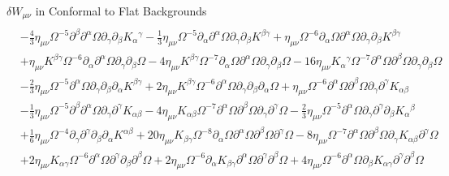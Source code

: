 \documentclass[8pt,aspectratio=1610]{beamer}
\begin{document}
\begin{frame}{$\delta W_{\mu\nu}$ in Conformal to Flat Backgrounds}
{\begin{align}
		\nonumber\\
		&-  \tfrac{4}{3} \eta_{\mu \nu} \Omega^{-5} \partial^{\beta}\partial^{\alpha}\Omega \partial_{\gamma}\partial_{\beta}K_{\alpha}{}^{\gamma} -  \tfrac{1}{3} \eta_{\mu \nu} \Omega^{-5} \partial_{\alpha}\partial^{\alpha}\Omega \partial_{\gamma}\partial_{\beta}K^{\beta \gamma} + \eta_{\mu \nu} \Omega^{-6} \partial_{\alpha}\Omega \partial^{\alpha}\Omega \partial_{\gamma}\partial_{\beta}K^{\beta \gamma}
		\nonumber\\
		& + \eta_{\mu \nu} K^{\beta \gamma} \Omega^{-6} \partial_{\alpha}\partial^{\alpha}\Omega \partial_{\gamma}\partial_{\beta}\Omega - 4 \eta_{\mu \nu} K^{\beta \gamma} \Omega^{-7} \partial_{\alpha}\Omega \partial^{\alpha}\Omega \partial_{\gamma}\partial_{\beta}\Omega - 16 \eta_{\mu \nu} K_{\alpha}{}^{\gamma} \Omega^{-7} \partial^{\alpha}\Omega \partial^{\beta}\Omega \partial_{\gamma}\partial_{\beta}\Omega 
		\nonumber\\
		&-  \tfrac{2}{3} \eta_{\mu \nu} \Omega^{-5} \partial^{\alpha}\Omega \partial_{\gamma}\partial_{\beta}\partial_{\alpha}K^{\beta \gamma} + 2 \eta_{\mu \nu} K^{\beta \gamma} \Omega^{-6} \partial^{\alpha}\Omega \partial_{\gamma}\partial_{\beta}\partial_{\alpha}\Omega + \eta_{\mu \nu} \Omega^{-6} \partial^{\alpha}\Omega \partial^{\beta}\Omega \partial_{\gamma}\partial^{\gamma}K_{\alpha \beta}
		\nonumber\\
		& -  \tfrac{1}{3} \eta_{\mu \nu} \Omega^{-5} \partial^{\beta}\partial^{\alpha}\Omega \partial_{\gamma}\partial^{\gamma}K_{\alpha \beta} - 4 \eta_{\mu \nu} K_{\alpha \beta} \Omega^{-7} \partial^{\alpha}\Omega \partial^{\beta}\Omega \partial_{\gamma}\partial^{\gamma}\Omega -  \tfrac{2}{3} \eta_{\mu \nu} \Omega^{-5} \partial^{\alpha}\Omega \partial_{\gamma}\partial^{\gamma}\partial_{\beta}K_{\alpha}{}^{\beta}
		\nonumber \\
		& + \tfrac{1}{6} \eta_{\mu \nu} \Omega^{-4} \partial_{\gamma}\partial^{\gamma}\partial_{\beta}\partial_{\alpha}K^{\alpha \beta} + 20 \eta_{\mu \nu} K_{\beta \gamma} \Omega^{-8} \partial_{\alpha}\Omega \partial^{\alpha}\Omega \partial^{\beta}\Omega \partial^{\gamma}\Omega - 8 \eta_{\mu \nu} \Omega^{-7} \partial^{\alpha}\Omega \partial^{\beta}\Omega \partial_{\gamma}K_{\alpha \beta} \partial^{\gamma}\Omega
		\nonumber\\
		& + 2 \eta_{\mu \nu} K_{\alpha \gamma} \Omega^{-6} \partial^{\alpha}\Omega \partial^{\gamma}\partial_{\beta}\partial^{\beta}\Omega + 2 \eta_{\mu \nu} \Omega^{-6} \partial_{\alpha}K_{\beta \gamma} \partial^{\alpha}\Omega \partial^{\gamma}\partial^{\beta}\Omega + 4 \eta_{\mu \nu} \Omega^{-6} \partial^{\alpha}\Omega \partial_{\beta}K_{\alpha \gamma} \partial^{\gamma}\partial^{\beta}\Omega 

\end{align}}
\end{frame}
\end{document}
